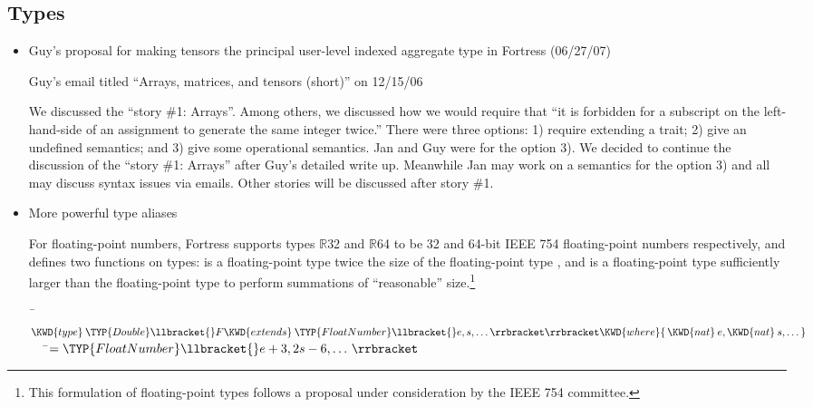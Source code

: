 \subsection{Types}
\begin{itemize}
\item Guy's proposal for making tensors the principal user-level indexed aggregate type in Fortress (06/27/07)

Guy's email titled ``Arrays, matrices, and tensors (short)'' on 12/15/06

We discussed the ``story \#1: Arrays''.  Among others,
we discussed how we would require that ``it is forbidden for a subscript on the left-hand-side of an assignment to generate the same integer twice.''
There were three options: 1) require extending a  trait;
2) give an undefined semantics; and 3) give some operational semantics.
Jan and Guy were for the option 3).
We decided to continue the discussion of the ``story \#1: Arrays'' after Guy's detailed write up.
Meanwhile Jan may work on a semantics for the option 3) and all may discuss syntax issues via emails.  Other stories will be discussed after story \#1.

\item More powerful type aliases

For floating-point numbers, Fortress supports types {$\mathbb{R}$32} and
{$\mathbb{R}$64}
to be 32 and 64-bit IEEE 754 floating-point numbers respectively,
and defines two functions on types:
 is a floating-point type twice the size of the
floating-point type , and  is a
floating-point
type sufficiently larger than the floating-point type  to
perform summations of ``reasonable'' size.\footnote{
This formulation of floating-point types follows a proposal under
consideration by the IEEE 754 committee.}

\begin{Fortress}
{\tt~}\pushtabs\=\+\( \KWD{type}\:\TYP{Double}\llbracket{}F \KWD{extends}\:\TYP{FloatNumber}\llbracket{}e, s, \ldots\rrbracket\rrbracket \KWD{where} \{\,\KWD{nat}\:e, \KWD{nat}\:s, \ldots\,\}\)\\
{\tt~~~}\pushtabs\=\+\(    = \TYP{FloatNumber}\llbracket{}e+3, 2 s - 6, \ldots\,\rrbracket\)\-\-\\\poptabs\poptabs
\end{Fortress}


\end{itemize}
